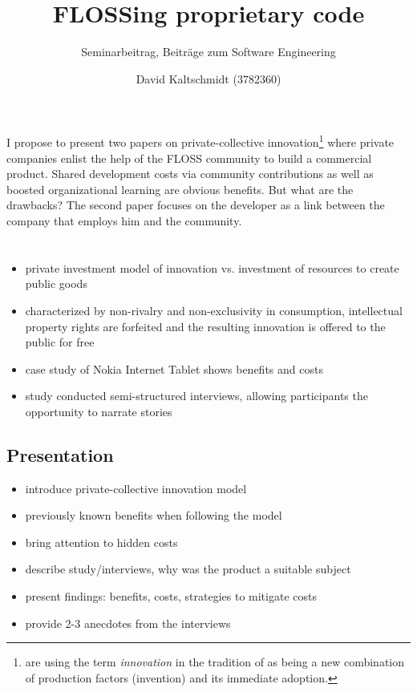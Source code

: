 \documentclass[a4paper]{scrartcl}
\title{FLOSSing proprietary code}
\subtitle{Seminarbeitrag, Beiträge zum Software Engineering}
\author{David Kaltschmidt (3782360)}
\newcommand*{\annotecite}[1]{\fullcite{#1}\\ {\color{gray}\citefield{#1}{annotation}}}
\begin{document}
\maketitle

I propose to present two papers on private-collective innovation\footnote{\citeauthor{stuermer2009extending} are using the term \emph{innovation} in the tradition of \textcite[Ch 3.B, p. 83]{schumpeter1939business} as being a new combination of production factors (invention) and its immediate adoption.} 
where private companies enlist the help of the FLOSS community to build a commercial product. 
Shared development costs via community contributions as well as boosted organizational learning are obvious benefits. 
But what are the drawbacks? 
The second paper focuses on the developer as a link between the company that employs him and the community.


\section*{}

\begin{itemize}
\item private investment model of innovation vs. investment of resources to create public goods 
\item characterized by non-rivalry and non-exclusivity in consumption, intellectual property rights are forfeited and the resulting innovation is offered to the public for free
\item case study of Nokia Internet Tablet shows benefits and costs
\item study conducted semi-structured interviews, allowing participants the opportunity to narrate stories
\end{itemize}

\subsection*{Presentation}

\begin{itemize}
\item introduce private-collective innovation model
\item previously known benefits when following the model
\item bring attention to hidden costs
\item describe study/interviews, why was the product a suitable subject
\item present findings: benefits, costs, strategies to mitigate costs
\item provide 2-3 anecdotes from the interviews
\end{itemize}
\end{document}
